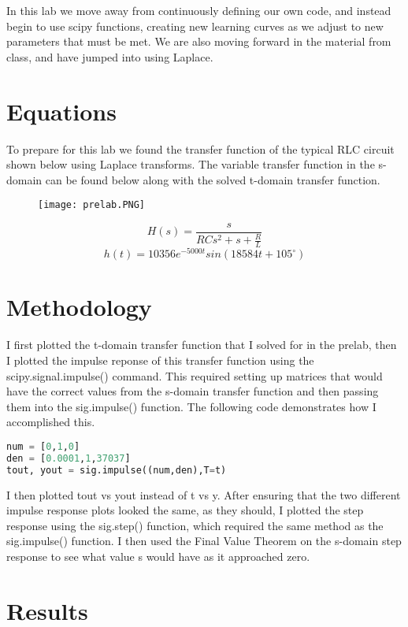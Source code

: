 \documentclass[12pt]{report}
\begin{document}
In this lab we move away from continuously defining our own code, and instead begin to use scipy functions, creating new learning curves as we adjust to new parameters that must be met. We are also moving forward in the material from class, and have jumped into using Laplace.

\section{Equations}

To prepare for this lab we found the transfer function of the  typical RLC circuit shown below using Laplace transforms. The variable transfer function in the s-domain can be found below along with the solved t-domain transfer function.

\begin{figure}[H]
    \centering
    \texttt{[image: prelab.PNG]}
\end{figure}

$$ H(s) = \frac{s}{RCs^2 + s + \frac{R}{L}} $$
$$ h(t) = 10356e^{-5000t}sin(18584t + 105^{\circ})$$

 \section{Methodology}
 
 I first plotted the t-domain transfer function that I solved for in the prelab, then I plotted the impulse reponse of this transfer function using the scipy.signal.impulse() command. This required setting up matrices that would have the correct values from the s-domain transfer function and then passing them into the sig.impulse() function. The following code demonstrates how I accomplished this. 
 \begin{lstlisting}[language=Python]
 num = [0,1,0]
den = [0.0001,1,37037]
tout, yout = sig.impulse((num,den),T=t)
\end{lstlisting}

I then plotted tout vs yout instead of t vs y. After ensuring that the two different impulse response plots looked the same, as they should, I plotted the step response using the sig.step() function, which required the same method as the sig.impulse() function. I then used the Final Value Theorem on the s-domain step response to see what value s would have as it approached zero. 
 
 \section{Results}
 
\end{document}
